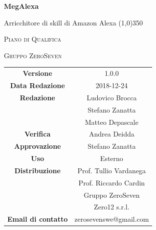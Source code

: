 \documentclass[a4paper,12pt]{book}
\author{Stefano Zanatta}
\date{2018-12-24}
\begin{document}
\begin{titlepage}
	\centering
	{\huge\bfseries MegAlexa\par}
	Arricchitore di skill di Amazon Alexa
	\line(1,0){350} \\
	{\scshape\LARGE Piano di Qualifica \par}
	\vspace{1cm}
	{\scshape Gruppo ZeroSeven \par}
	\logo
	\begin{tabular}{c|c}
		{\hfill \textbf{Versione}} 			& 1.0.0				\\
		{\hfill\textbf{Data Redazione}} 	& 2018-12-24		\\ 
		{\hfill\textbf{Redazione}} 			&  Ludovico Brocca\\ &		Stefano Zanatta			\\& Matteo Depascale\\
	{\hfill\textbf{Verifica}} 				&  	Andrea Deidda			\\ 
		{\hfill\textbf{Approvazione}} 		&  		Stefano Zanatta			\\ 
	{\hfill\textbf{Uso}} 					& 		Esterno		\\ 
	{\hfill\textbf{Distribuzione}} 			& 			Prof. Tullio Vardanega \\ & Prof. Riccardo Cardin \\ & Gruppo ZeroSeven		\\ & Zero12 s.r.l. \\
		{\hfill\textbf{Email di contatto}} & zerosevenswe@gmail.com \\
	\end{tabular}
\end{titlepage}
	

	
	\label{LastFrontPage}
	\newpage	
	
	\pagestyle{mymain}
	\tableofcontents
	\listoftables
	
	
	

	\begin{appendices}
		
		
	\end{appendices}

			
	\label{LastPage}
\end{document}
